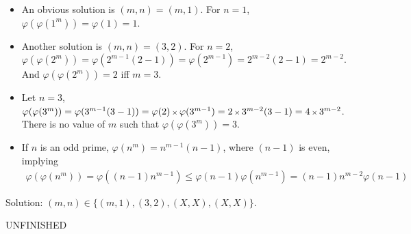 \begin{itemize}[label={-}]
\item An obvious solution is $(m,n)=(m,1)$. For $n=1$, $\varphi(\varphi(1^{m}))=\varphi(1)=1$. 

\item Another solution is $(m,n)=(3,2)$.
For $n=2$, $\varphi(\varphi(2^{m}))=\varphi(2^{m-1}(2-1))=\varphi(2^{m-1})=2^{m-2}(2-1)=2^{m-2}$. And $\varphi(\varphi(2^{m}))=2$ iff $m=3$. 

\item Let $n=3$, $\varphi(\varphi(3^{m}))=\varphi(3^{m-1}(3-1))=\varphi(2) \operatorname{\mbox{\scriptsize$\times$}} \varphi(3^{m-1})=2 \operatorname{\mbox{\scriptsize$\times$}} 3^{m-2}(3-1)=4 \operatorname{\mbox{\scriptsize$\times$}} 3^{m-2}$. There is no value of $m$ such that $\varphi(\varphi(3^{m}))=3$. 

\item If $n$ is an odd prime, $\varphi(n^{m})=n^{m-1}(n-1)$, where $(n-1)$ is even, implying
\begin{align*}
\varphi(\varphi(n^{m})) = \varphi((n-1)n^{m-1})
\le \varphi(n-1) \varphi(n^{m-1})
= (n-1) n^{m-2} \varphi(n-1)
\end{align*}
\end{itemize}

Solution: $(m,n) \in \{ (m,1), (3,2), (X,X), (X,X) \}$. 


UNFINISHED